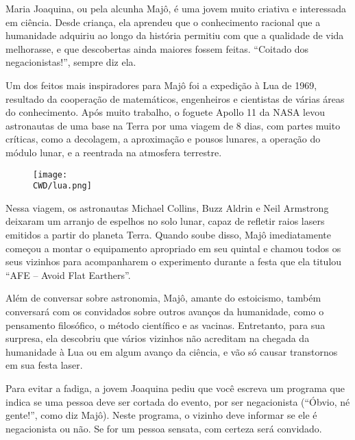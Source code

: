 %

Maria Joaquina, ou pela alcunha Majô, é uma jovem muito criativa e interessada em ciência. Desde criança, ela aprendeu que o conhecimento racional que a humanidade adquiriu ao longo da história permitiu com que a qualidade de vida melhorasse, e que descobertas ainda maiores fossem feitas. “Coitado dos negacionistas!”, sempre diz ela.

Um dos feitos mais inspiradores para Majô foi a expedição à Lua de 1969, resultado da cooperação de matemáticos, engenheiros e cientistas de várias áreas do conhecimento. Após muito trabalho, o foguete Apollo 11 da NASA levou astronautas de uma base na Terra por uma viagem de 8 dias, com partes muito críticas, como a decolagem, a aproximação e pousos lunares, a operação do módulo lunar, e a reentrada na atmosfera terrestre.

\begin{figure}[!htb]
	\centering
	\texttt{[image: \\CWD/lua.png]}
\end{figure}

Nessa viagem, os astronautas Michael Collins, Buzz Aldrin e Neil Armstrong  deixaram um arranjo de espelhos no solo lunar, capaz de refletir raios lasers emitidos a partir do planeta Terra. Quando soube disso, Majô imediatamente começou a montar o equipamento apropriado em seu quintal e chamou todos os seus vizinhos para acompanharem o experimento durante a festa que ela titulou ``AFE – Avoid Flat Earthers''.

Além de conversar sobre astronomia, Majô, amante do estoicismo, também conversará com os convidados sobre outros avanços da humanidade, como o pensamento filosófico, o método científico e as vacinas. Entretanto, para sua surpresa, ela descobriu que vários vizinhos não acreditam na chegada da humanidade à Lua ou em algum avanço da ciência, e vão só causar transtornos em sua festa laser.

Para evitar a fadiga, a jovem Joaquina pediu que você escreva um programa que indica se uma pessoa deve ser cortada do evento, por ser negacionista (``Óbvio, né gente!'', como diz Majô). Neste programa, o vizinho deve informar se ele é negacionista ou não. Se for um pessoa sensata, com certeza será convidado.

